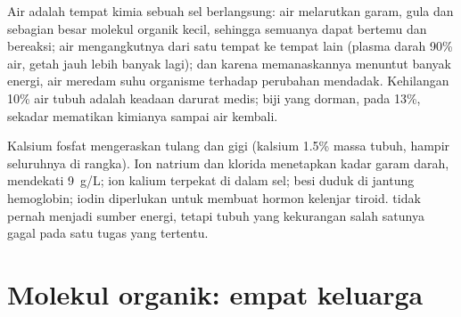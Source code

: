 \begin{proposition}\label{prop:g10:chemistry-of-life:water-roles}
Air adalah tempat kimia sebuah sel berlangsung: air melarutkan garam,
gula dan sebagian besar molekul organik kecil, sehingga semuanya dapat
bertemu dan bereaksi; air mengangkutnya dari satu tempat ke tempat lain
(plasma darah 90\% air, getah jauh lebih banyak lagi); dan karena
memanaskannya menuntut banyak energi, air meredam suhu organisme
terhadap perubahan mendadak. Kehilangan 10\% air tubuh adalah keadaan
darurat medis; biji yang dorman, pada 13\%, sekadar mematikan kimianya
sampai air kembali.
\end{proposition}
\admitted

\begin{example}\label{ex:g10:chemistry-of-life:salts}
Kalsium fosfat mengeraskan tulang dan gigi (kalsium 1.5\% massa tubuh,
hampir seluruhnya di rangka). Ion natrium dan klorida menetapkan kadar
garam darah, mendekati \qty{9}{g/L}; ion kalium terpekat di dalam sel;
besi duduk di jantung hemoglobin; iodin diperlukan untuk membuat hormon
kelenjar tiroid.  tidak pernah menjadi sumber energi,
tetapi tubuh yang kekurangan salah satunya gagal pada satu tugas yang
tertentu.
\end{example}

\section{Molekul organik: empat keluarga}

